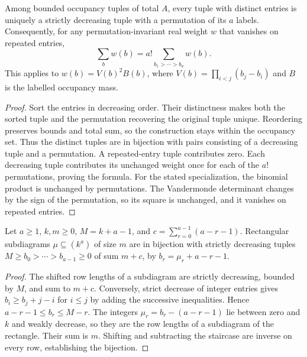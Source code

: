 \begin{lemma}
\label{lem:occupancy-sorting}
\leanok
Among bounded occupancy tuples of total $A$, every tuple with distinct
entries is uniquely a strictly decreasing tuple with a permutation of its
$a$ labels. Consequently, for any permutation-invariant real weight $w$
that vanishes on repeated entries,
\[
 \sum_b w(b)=a!\sum_{b_1>\cdots>b_a}w(b).
\]
This applies to $w(b)=V(b)^2B(b)$, where
$V(b)=\prod_{i<j}(b_j-b_i)$ and $B$ is the labelled occupancy mass.
\end{lemma}
\begin{proof}
Sort the entries in decreasing order. Their distinctness makes both the
sorted tuple and the permutation recovering the original tuple unique.
Reordering preserves bounds and total sum, so the construction stays within
the occupancy set. Thus the distinct tuples are in bijection with pairs
consisting of a decreasing tuple and a permutation. A repeated-entry tuple
contributes zero. Each decreasing tuple contributes its unchanged weight
once for each of the $a!$ permutations, proving the formula.
For the stated specialization, the binomial product is unchanged by
permutations. The Vandermonde determinant changes by the sign of the
permutation, so its square is unchanged, and it vanishes on repeated entries.
\end{proof}

\begin{lemma}
\label{lem:shifted-shape-equivalence}
\leanok
Let $a\geq1$, $k,m\geq0$, $M=k+a-1$, and
$c=\sum_{r=0}^{a-1}(a-r-1)$. Rectangular subdiagrams
$\mu\subseteq(k^a)$ of size $m$ are in bijection with strictly
decreasing tuples $M\geq b_0>\cdots>b_{a-1}\geq0$ of sum $m+c$,
by $b_r=\mu_r+a-r-1$.
\end{lemma}
\begin{proof}
The shifted row lengths of a subdiagram are strictly decreasing,
bounded by $M$, and sum to $m+c$. Conversely, strict decrease of
integer entries gives $b_i\geq b_j+j-i$ for $i\leq j$ by adding
the successive inequalities. Hence $a-r-1\leq b_r\leq M-r$.
The integers $\mu_r=b_r-(a-r-1)$ lie between zero and $k$ and
weakly decrease, so they are the row lengths of a subdiagram of
the rectangle. Their sum is $m$. Shifting and subtracting the
staircase are inverse on every row, establishing the bijection.
\end{proof}

